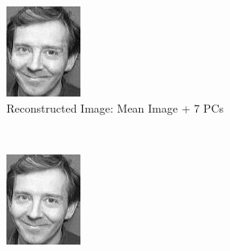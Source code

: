 \documentclass[12pt]{article}
\begin{document}
\begin{figure}
\begin{subfigure}[b]{0.20\textwidth}
		\includegraphics[width=\textwidth]{Task4.3_Images/ReconstructedImage7.jpg}
		\caption{Reconstructed Image: Mean Image + 7 PCs}
	\end{subfigure}\\
	\begin{subfigure}[b]{0.20\textwidth}
		\includegraphics[width=\textwidth]{Task4.3_Images/ReconstructedImage8.jpg}

\end{subfigure}
\end{figure}
\end{document}
